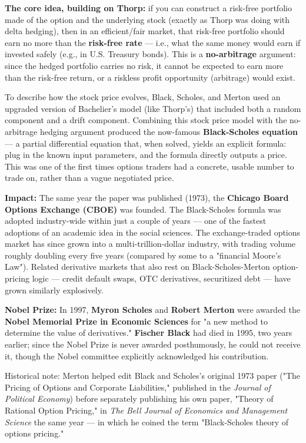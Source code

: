 \documentclass[12pt,openany]{book}
\theoremstyle{definition}
\theoremstyle{remark}
\begin{document}
\textbf{The core idea, building on Thorp:} if you can construct a risk-free portfolio made of the option and the underlying stock (exactly as Thorp was doing with delta hedging), then in an efficient/fair market, that risk-free portfolio should earn no more than the \textbf{risk-free rate} --- i.e., what the same money would earn if invested safely (e.g., in U.S. Treasury bonds). This is a \textbf{no-arbitrage} argument: since the hedged portfolio carries no risk, it cannot be expected to earn more than the risk-free return, or a riskless profit opportunity (arbitrage) would exist.

To describe how the stock price evolves, Black, Scholes, and Merton used an upgraded version of Bachelier's model (like Thorp's) that included both a random component and a drift component. Combining this stock price model with the no-arbitrage hedging argument produced the now-famous \textbf{Black-Scholes equation} --- a partial differential equation that, when solved, yields an explicit formula: plug in the known input parameters, and the formula directly outputs a price. This was one of the first times options traders had a concrete, usable number to trade on, rather than a vague negotiated price.

\textbf{Impact:} The same year the paper was published (1973), the \textbf{Chicago Board Options Exchange (CBOE)} was founded. The Black-Scholes formula was adopted industry-wide within just a couple of years --- one of the fastest adoptions of an academic idea in the social sciences. The exchange-traded options market has since grown into a multi-trillion-dollar industry, with trading volume roughly doubling every five years (compared by some to a "financial Moore's Law"). Related derivative markets that also rest on Black-Scholes-Merton option-pricing logic --- credit default swaps, OTC derivatives, securitized debt --- have grown similarly explosively.

\textbf{Nobel Prize:} In 1997, \textbf{Myron Scholes} and \textbf{Robert Merton} were awarded the \textbf{Nobel Memorial Prize in Economic Sciences} for "a new method to determine the value of derivatives." \textbf{Fischer Black} had died in 1995, two years earlier; since the Nobel Prize is never awarded posthumously, he could not receive it, though the Nobel committee explicitly acknowledged his contribution.

Historical note: Merton helped edit Black and Scholes's original 1973 paper ("The Pricing of Options and Corporate Liabilities," published in the \emph{Journal of Political Economy}) before separately publishing his own paper, "Theory of Rational Option Pricing," in \emph{The Bell Journal of Economics and Management Science} the same year --- in which he coined the term "Black-Scholes theory of options pricing."
\end{document}
